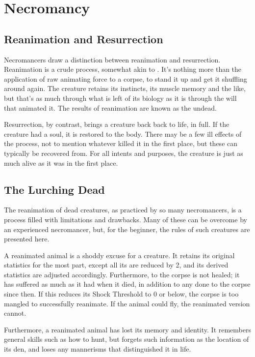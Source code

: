 \chapter{Necromancy}

\section{Reanimation and Resurrection}

Necromancers draw a distinction between reanimation and resurrection.
Reanimation is a crude process, somewhat akin to .
It's nothing more than the application of raw animating force to a corpse, to stand it up and get it shuffling around again.
The creature retains its instincts, its muscle memory and the like, but that's as much through what is left of its biology as it is through the will that animated it.
The results of reanimation are known as the undead.

Resurrection, by contrast, brings a creature back back to life, in full.
If the creature had a soul, it is restored to the body.
There may be a few ill effects of the process, not to mention whatever killed it in the first place, but these can typically be recovered from.
For all intents and purposes, the creature is just as much alive as it was in the first place.

\section{The Lurching Dead}

The reanimation of dead creatures, as practiced by so many necromancers, is a process filled with limitations and drawbacks.
Many of these can be overcome by an experienced necromancer, but, for the beginner, the rules of such creatures are presented here.

A reanimated animal is a shoddy excuse for a creature.
It retains its original statistics for the most part, except all its  are reduced by 2, and its derived statistics are adjusted accordingly.
Furthermore,  to the corpse is not healed; it has suffered as much  as it had when it died, in addition to any  done to the corpse since then.
If this reduces its Shock Threshold to 0 or below, the corpse is too mangled to successfully reanimate.
If the animal could fly, the reanimated version cannot.

Furthermore, a reanimated animal has lost its memory and identity.
It remembers general skills such as how to hunt, but forgets such information as the location of its den, and loses any mannerisms that distinguished it in life.


